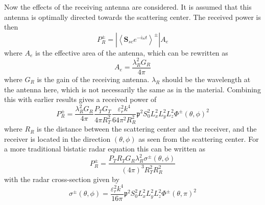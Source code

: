 \documentclass[10pt,a4paper,draft]{scrartcl}
\begin{document}
	Now the effects of the receiving antenna are considered. It is assumed that this antenna is optimally directed towards the scattering center. The received power is then
	\begin{equation*}
		P_R^\pm = \left| \left< \bm{S}_{sc} e^{-i\omega t} \right>^\pm \right| A_e
	\end{equation*}
	where $A_e$ is the effective area of the antenna, which can be rewritten as
	\begin{equation*}
		A_e = \frac{\lambda_R^2 G_R}{4\pi}
	\end{equation*}
	where $G_R$ is the gain of the receiving antenna. $\lambda_R$ should be the wavelength at the antenna here, which is not necessarily the same as in the material. Combining this with earlier results gives a received power of
	\begin{equation*}
		P_R^\pm = \frac{\lambda_R^2 G_R}{4\pi} \frac{P_T G_T}{4\pi R_T^2} \frac{\varepsilon_r^2 k^4}{64 \pi^2 R_R^2} \mathfrak{p}^2 S_0^2 L_x^2 L_y^2 L_z^2 \Phi^\pm (\theta,\phi)^2
	\end{equation*}
	where $R_R$ is the distance between the scattering center and the receiver, and the receiver is located in the direction $(\theta,\phi)$ as seen from the scattering center. For a more traditional bistatic radar equation this can be written as
	\begin{equation*}
	P_R^\pm = \frac{P_T R_T G_R \lambda_R^2 \sigma^\pm (\theta,\phi)}{(4\pi)^3 R_T^2 R_R^2}
	\end{equation*}
	with the radar cross-section given by
	\begin{equation*}
		\sigma^\pm (\theta, \phi) = \frac{\varepsilon_r^2 k^4}{16\pi} \mathfrak{p}^2 S_0^2 L_x^2 L_y^2 L_z^2 \Phi^\pm (\theta,\pi)^2
	\end{equation*}
	
\end{document}
